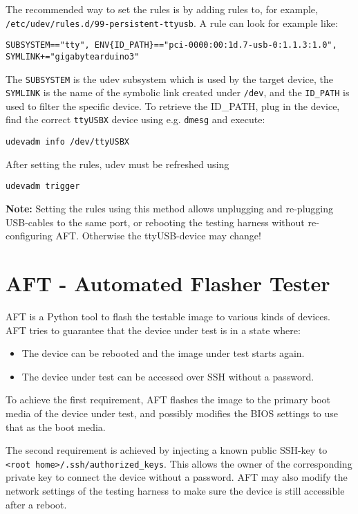 \documentclass[a4paper,11pt]{article}
\newcommand{\note}{\textbf{Note: }}
\newcommand{\cmd}[1]{\texttt{#1}}
\begin{document}
The recommended way to set the rules is by adding rules to, for example, \\ \cmd{/etc/udev/rules.d/99-persistent-ttyusb}. A rule can look for example like:
\begin{lstlisting}
SUBSYSTEM=="tty", ENV{ID_PATH}=="pci-0000:00:1d.7-usb-0:1.1.3:1.0", SYMLINK+="gigabytearduino3"
\end{lstlisting}
The \cmd{SUBSYSTEM} is the udev subsystem which is used by the target device, the \cmd{SYMLINK} is the name of the symbolic link created under \cmd{/dev}, and the \cmd{ID\_PATH} is used to filter the specific device. To retrieve the {ID\_PATH}, plug in the device, find the correct \cmd{ttyUSBX} device using e.g. \cmd{dmesg} and execute:
\begin{lstlisting}
udevadm info /dev/ttyUSBX
\end{lstlisting}

After setting the rules, udev must be refreshed using
\begin{lstlisting}
udevadm trigger
\end{lstlisting}

\note Setting the rules using this method allows unplugging and re-plugging USB-cables to the same port, or rebooting the testing harness without re-configuring AFT. Otherwise the ttyUSB-device may change!

\section{AFT - Automated Flasher Tester}
\label{aft}

AFT is a Python tool to flash the testable image to various kinds of devices.  AFT tries to guarantee that the device under test is in a state where:
\begin{itemize}
\item The device can be rebooted and the image under test starts again.
\item The device under test can be accessed over SSH without a password.
\end{itemize}

To achieve the first requirement, AFT flashes the image to the primary boot media of the device under test, and possibly modifies the BIOS settings to use that as the boot media.

The second requirement is achieved by injecting a known public SSH-key to \linebreak\cmd{<root home>/.ssh/authorized\_keys}. This allows the owner of the corresponding private key to connect the device without a password. AFT may also modify the network settings of the testing harness to make sure the device is still accessible after a reboot.
\end{document}
